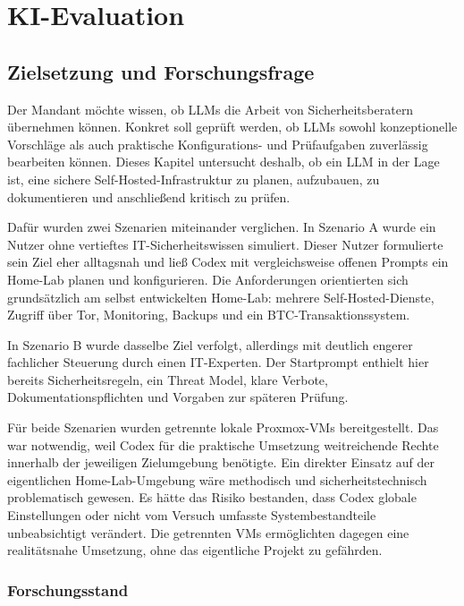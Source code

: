 \chapter{\ac{KI}-Evaluation}
\label{chap:ki-evaluation}

\section{Zielsetzung und Forschungsfrage}

Der Mandant möchte wissen, ob \acp{LLM} die Arbeit von Sicherheitsberatern übernehmen können. Konkret soll geprüft werden, ob \acp{LLM} sowohl konzeptionelle Vorschläge als auch praktische Konfigurations- und Prüfaufgaben zuverlässig bearbeiten können. Dieses Kapitel untersucht deshalb, ob ein \ac{LLM} in der Lage ist, eine sichere Self-Hosted-Infrastruktur zu planen, aufzubauen, zu dokumentieren und anschließend kritisch zu prüfen.

Dafür wurden zwei Szenarien miteinander verglichen. In Szenario A wurde ein Nutzer ohne vertieftes \ac{IT}-Sicherheitswissen simuliert. Dieser Nutzer formulierte sein Ziel eher alltagsnah und ließ Codex mit vergleichsweise offenen Prompts ein Home-Lab planen und konfigurieren. Die Anforderungen orientierten sich grundsätzlich am selbst entwickelten Home-Lab: mehrere Self-Hosted-Dienste, Zugriff über Tor, Monitoring, Backups und ein \ac{BTC}-Transaktionssystem.

In Szenario B wurde dasselbe Ziel verfolgt, allerdings mit deutlich engerer fachlicher Steuerung durch einen \ac{IT}-Experten. Der Startprompt enthielt hier bereits Sicherheitsregeln, ein Threat Model, klare Verbote, Dokumentationspflichten und Vorgaben zur späteren Prüfung.

Für beide Szenarien wurden getrennte lokale Proxmox-\acp{VM} bereitgestellt. Das war notwendig, weil Codex für die praktische Umsetzung weitreichende Rechte innerhalb der jeweiligen Zielumgebung benötigte. Ein direkter Einsatz auf der eigentlichen Home-Lab-Umgebung wäre methodisch und sicherheitstechnisch problematisch gewesen. Es hätte das Risiko bestanden, dass Codex globale Einstellungen oder nicht vom Versuch umfasste Systembestandteile unbeabsichtigt verändert. Die getrennten \acp{VM} ermöglichten dagegen eine realitätsnahe Umsetzung, ohne das eigentliche Projekt zu gefährden.\cite{openai2026codexsandbox}

\subsection{Forschungsstand}

